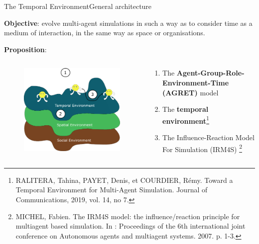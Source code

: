 \begin{frame}{The Temporal Environment}{General architecture}
\par \textbf{Objective}: evolve multi-agent simulations in such a way as to consider time as a medium of interaction, in the same way as space or organisations.
\vspace{1cm}
\par \textbf{Proposition}:

\begin{columns}
\begin{column}{.3\linewidth}
\begin{figure}
    \includegraphics[width=\linewidth]{figures/temporalRepresentation.png}
\end{figure}
\end{column}
\begin{column}{.7\linewidth}
\begin{enumerate}
    \item The \textbf{Agent-Group-Role-Environment-Time (AGRET)} model
    \item The \textbf{temporal environment}\footnote{RALITERA, Tahina, PAYET, Denis, et COURDIER, Rémy. Toward a Temporal Environment for Multi-Agent Simulation. Journal of Communications, 2019, vol. 14, no 7.}
    \item The Influence-Reaction Model For Simulation (IRM4S) \footnote{MICHEL, Fabien. The IRM4S model: the influence/reaction principle for multiagent based simulation. In : Proceedings of the 6th international joint conference on Autonomous agents and multiagent systems. 2007. p. 1-3.}

\end{enumerate}
\end{column}
\end{columns}
\end{frame}
